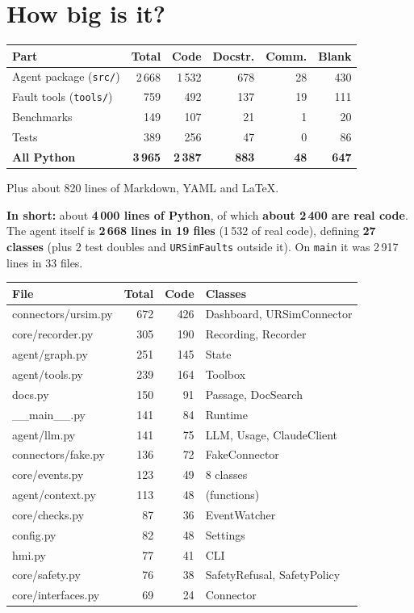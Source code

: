 \documentclass[10pt]{article}
\newcommand{\brkus}{\textunderscore\allowbreak}
\newcommand{\f}[1]{\texttt{\let\_\brkus #1}}
\begin{document}
\section{How big is it?}

\begin{center}\small
\begin{tabular}{@{}lrrrrr@{}}
\toprule
\textbf{Part} & \textbf{Total} & \textbf{Code} & \textbf{Docstr.} & \textbf{Comm.} & \textbf{Blank} \\
\midrule
Agent package (\f{src/}) & 2\,668 & 1\,532 & 678 & 28 & 430 \\
Fault tools (\f{tools/}) & 759 & 492 & 137 & 19 & 111 \\
Benchmarks & 149 & 107 & 21 & 1 & 20 \\
Tests & 389 & 256 & 47 & 0 & 86 \\
\midrule
\textbf{All Python} & \textbf{3\,965} & \textbf{2\,387} & \textbf{883} & \textbf{48} & \textbf{647} \\
\bottomrule
\end{tabular}
\end{center}
Plus about 820 lines of Markdown, YAML and LaTeX.

\textbf{In short:} about \textbf{4\,000 lines of Python}, of which \textbf{about 2\,400 are real
code}. The agent itself is \textbf{2\,668 lines in 19 files} (1\,532 of real code), defining
\textbf{27 classes} (plus 2 test doubles and \f{URSimFaults} outside it). On \f{main} it was
2\,917 lines in 33 files.

\begin{center}\footnotesize
\begin{tabular}{@{}lrrl@{}}
\toprule
\textbf{File} & \textbf{Total} & \textbf{Code} & \textbf{Classes} \\
\midrule
connectors/ursim.py & 672 & 426 & Dashboard, URSimConnector \\
core/recorder.py & 305 & 190 & Recording, Recorder \\
agent/graph.py & 251 & 145 & State \\
agent/tools.py & 239 & 164 & Toolbox \\
docs.py & 150 & 91 & Passage, DocSearch \\
\_\_main\_\_.py & 141 & 84 & Runtime \\
agent/llm.py & 141 & 75 & LLM, Usage, ClaudeClient \\
connectors/fake.py & 136 & 72 & FakeConnector \\
core/events.py & 123 & 49 & 8 classes \\
agent/context.py & 113 & 48 & (functions) \\
core/checks.py & 87 & 36 & EventWatcher \\
config.py & 82 & 48 & Settings \\
hmi.py & 77 & 41 & CLI \\
core/safety.py & 76 & 38 & SafetyRefusal, SafetyPolicy \\
core/interfaces.py & 69 & 24 & Connector \\
\bottomrule
\end{tabular}
\end{center}
\end{document}
